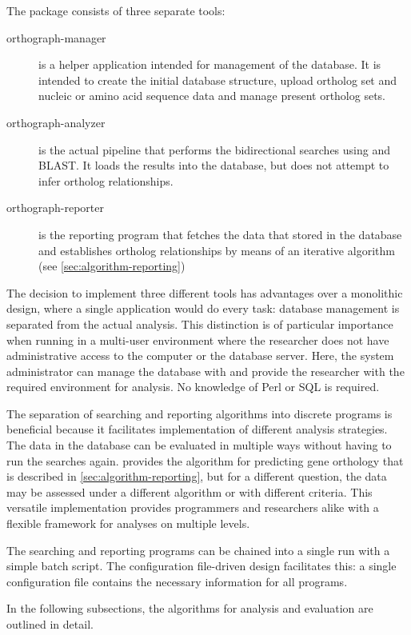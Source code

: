 \label{sec:algorithm}
The \pname package consists of three separate tools:

\begin{description}
	\item[orthograph-manager] is a helper application intended for management of
		the database. It is intended to create the initial database structure, upload
		ortholog set and nucleic or amino acid sequence data and manage present
		ortholog sets.
	\item[orthograph-analyzer] is the actual pipeline that performs the
		bidirectional searches using  and BLAST. It loads the
		results into the database, but does not attempt to infer ortholog
		relationships. 
	\item[orthograph-reporter] is the reporting program that fetches the data that
		 stored in the database and establishes ortholog
		relationships by means of an iterative algorithm (see
		\autoref{sec:algorithm-reporting})
\end{description}

The decision to implement three different tools  has advantages over a
monolithic design, where a single application would do every task: database
management is separated from the actual analysis. This distinction is of
particular importance when running \pname in a multi-user environment where the
researcher does not have administrative access to the computer or the database
server. Here, the system administrator can manage the database with
 and provide the researcher with the required
environment for analysis. No knowledge of Perl or SQL is required.

The separation of searching and reporting algorithms into discrete programs is
beneficial because it facilitates implementation of different analysis
strategies. The data in the database can be evaluated in multiple ways without
having to run the searches again.  provides the
algorithm for predicting gene orthology that is described in
\autoref{sec:algorithm-reporting}, but for a different question, the data may be
assessed under a different algorithm or with different criteria. This versatile
implementation provides programmers and researchers alike with a flexible
framework for analyses on multiple levels. 

The searching and reporting programs can be chained into a single run with a
simple batch script. The configuration file-driven design facilitates this: a
single configuration file contains the necessary information for all \pname
programs.

In the following subsections, the algorithms for analysis and evaluation are
outlined in detail.
